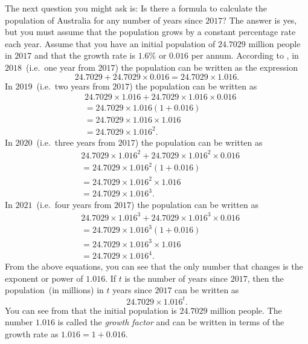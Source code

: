 \documentclass[a4paper,oneside,12pt]{article}
\begin{document}
The next question you might ask is:  Is there a formula to calculate
the population of Australia for any number of years since $2017$?  The
answer is yes, but you must assume that the population grows by a
constant percentage rate each year.  Assume that you have an initial
population of $24.7029$ million people in $2017$ and that the growth
rate is $1.6\%$ or $0.016$ per annum.  According to
, in
$2018$~(i.e.~one year from $2017$) the population can be written as
the expression
\[
24.7029 + 24.7029 \times 0.016
=
24.7029 \times 1.016.
\]
In $2019$~(i.e.~two years from $2017$) the population can be written
as
\begin{align*}
&24.7029 \times 1.016 + 24.7029 \times 1.016 \times 0.016 \\[4pt]
&=
24.7029 \times 1.016 (1 + 0.016) \\[4pt]
&=
24.7029 \times 1.016 \times 1.016 \\[4pt]
&=
24.7029 \times 1.016^2.
\end{align*}
In $2020$~(i.e.~three years from $2017$) the population can be written
as
\begin{align*}
&24.7029 \times 1.016^2 + 24.7029 \times 1.016^2 \times 0.016 \\[4pt]
&=
24.7029 \times 1.016^2 (1 + 0.016) \\[4pt]
&=
24.7029 \times 1.016^2 \times 1.016 \\[4pt]
&=
24.7029 \times 1.016^3.
\end{align*}
In $2021$~(i.e.~four years from $2017$) the population can be written
as
\begin{align*}
&24.7029 \times 1.016^3 + 24.7029 \times 1.016^3 \times 0.016 \\[4pt]
&=
24.7029 \times 1.016^3 (1 + 0.016) \\[4pt]
&=
24.7029 \times 1.016^3 \times 1.016 \\[4pt]
&=
24.7029 \times 1.016^4.
\end{align*}
From the above equations, you can see that the only number that
changes is the exponent or power of $1.016$.  If $t$ is the number of
years since $2017$, then the population~(in millions) in $t$ years
since $2017$ can be written as
\begin{equation}
\label{eqn:exponential:Australian_population_formula}
24.7029 \times 1.016^t.
\end{equation}
You can see from
 that the
initial population is $24.7029$ million people.  The number $1.016$ is
called the \emph{growth factor} and can be written in terms of the
growth rate as $1.016 = 1 + 0.016$.
\end{document}
